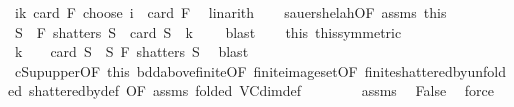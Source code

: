 \begin{isabellebody}
\ {\isachardoublequoteopen}{\isacharparenleft}{\kern0pt}{\isasymSum}i{\isasymle}k{\isachardot}{\kern0pt}\ card\ {\isacharparenleft}{\kern0pt}{\isasymUnion}F{\isacharparenright}{\kern0pt}\ choose\ i{\isacharparenright}{\kern0pt}\ {\isacharless}{\kern0pt}\ card\ F{\isachardoublequoteclose}\ \isamarkupfalse%
\ linarith\isanewline
\ \ \isamarkupfalse%
\ sauer{\isacharunderscore}{\kern0pt}shelah{\isacharbrackleft}{\kern0pt}OF\ assms{\isacharparenleft}{\kern0pt}{}{\isacharparenright}{\kern0pt}\ this{\isacharbrackright}{\kern0pt}\ \isamarkupfalse%
\ S\ \ {\isachardoublequoteopen}F\ shatters\ S{\isachardoublequoteclose}\ \ {\isachardoublequoteopen}card\ S\ {\isacharequal}{\kern0pt}\ k\ {\isacharplus}{\kern0pt}\ {}{\isachardoublequoteclose}\ \isamarkupfalse%
\ blast\isanewline
\ \ \isamarkupfalse%
\ this{\isacharparenleft}{\kern0pt}{}{\isacharparenright}{\kern0pt}\ this{\isacharparenleft}{\kern0pt}{}{\isacharparenright}{\kern0pt}{\isacharbrackleft}{\kern0pt}symmetric{\isacharbrackright}{\kern0pt}\ \isamarkupfalse%
\ {\isachardoublequoteopen}k\ {\isacharplus}{\kern0pt}\ {}\ {\isasymin}\ {\isacharbraceleft}{\kern0pt}card\ S\ {\isacharbar}{\kern0pt}\ S{\isachardot}{\kern0pt}\ F\ shatters\ S{\isacharbraceright}{\kern0pt}{\isachardoublequoteclose}\ \isamarkupfalse%
\ blast\isanewline
\ \ \isamarkupfalse%
\ cSup{\isacharunderscore}{\kern0pt}upper{\isacharbrackleft}{\kern0pt}OF\ this\ bdd{\isacharunderscore}{\kern0pt}above{\isacharunderscore}{\kern0pt}finite{\isacharbrackleft}{\kern0pt}OF\ finite{\isacharunderscore}{\kern0pt}image{\isacharunderscore}{\kern0pt}set{\isacharbrackleft}{\kern0pt}OF\ finite{\isacharunderscore}{\kern0pt}shattered{\isacharunderscore}{\kern0pt}by{\isacharbrackleft}{\kern0pt}unfolded\ shattered{\isacharunderscore}{\kern0pt}by{\isacharunderscore}{\kern0pt}def{\isacharcomma}{\kern0pt}\ OF\ assms{\isacharparenleft}{\kern0pt}{}{\isacharparenright}{\kern0pt}{\isacharbrackright}{\kern0pt}{\isacharbrackright}{\kern0pt}{\isacharbrackright}{\kern0pt}{\isacharcomma}{\kern0pt}\ folded\ VC{\isacharunderscore}{\kern0pt}dim{\isacharunderscore}{\kern0pt}def{\isacharbrackright}{\kern0pt}\ \isanewline
\ \ \ \ \ \ \ assms{\isacharparenleft}{\kern0pt}{}{\isacharparenright}{\kern0pt}\ \isamarkupfalse%
\ False\ \isamarkupfalse%
\ force\isanewline
{}\isamarkupfalse%
%
\endisatagproof
{\isafoldproof}%
%
\isadelimproof
\isanewline
%
\endisadelimproof
%
\isadelimtheory
\isanewline
%
\endisadelimtheory
%
\isatagtheory
{}\isamarkupfalse%
%
\endisatagtheory
{\isafoldtheory}%
%
\isadelimtheory
%
\endisadelimtheory
%
\end{isabellebody}%
